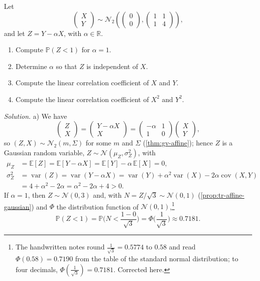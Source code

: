 \begin{example}\label{exa:gc-correlations}
Let
\[
  \begin{pmatrix}X\\Y\end{pmatrix}\sim\mathcal N_2\left(\begin{pmatrix}0\\0\end{pmatrix},
  \begin{pmatrix}1&1\\1&4\end{pmatrix}\right),
\]
and let $Z=Y-\alpha X$, with $\alpha\in\mathbb R$.
\begin{enumerate}[label=\alph*)]
  \item Compute $\mathbb P(Z<1)$ for $\alpha=1$.
  \item Determine $\alpha$ so that $Z$ is independent of $X$.
  \item Compute the linear correlation coefficient of $X$ and $Y$.
  \item Compute the linear correlation coefficient of $X^2$ and $Y^2$.
\end{enumerate}

\emph{Solution.} a) We have
\[
  \begin{pmatrix}Z\\X\end{pmatrix}=\begin{pmatrix}Y-\alpha X\\X\end{pmatrix}
  =\begin{pmatrix}-\alpha&1\\1&0\end{pmatrix}\begin{pmatrix}X\\Y\end{pmatrix},
\]
so $(Z,X)\sim\mathcal N_2(m,\Sigma)$ for some $m$ and $\Sigma$ (\cref{thm:gv-affine}); hence $Z$ is a
Gaussian random variable, $Z\sim\mathcal N(\mu_Z,\sigma_Z^2)$, with
\[
\begin{aligned}
  \mu_Z&=\mathbb E[Z]=\mathbb E[Y-\alpha X]=\mathbb E[Y]-\alpha\,\mathbb E[X]=0,\\
  \sigma_Z^2&=\operatorname{var}(Z)=\operatorname{var}(Y-\alpha X)
  =\operatorname{var}(Y)+\alpha^2\operatorname{var}(X)-2\alpha\operatorname{cov}(X,Y)\\
  &=4+\alpha^2-2\alpha=\alpha^2-2\alpha+4>0 .
\end{aligned}
\]
If $\alpha=1$, then $Z\sim\mathcal N(0,3)$ and, with $N=Z/\sqrt3\sim\mathcal N(0,1)$
(\cref{prop:tr-affine-gaussian}) and $\Phi$ the distribution function of
$\mathcal N(0,1)$,\footnote{The handwritten notes round $\frac1{\sqrt3}=0.5774$ to $0.58$ and read
$\Phi(0.58)=0.7190$ from the table of the standard normal distribution; to four decimals,
$\Phi(\frac1{\sqrt3})=0.7181$. Corrected here.}
\[
  \mathbb P(Z<1)=\mathbb P\Big(N<\frac{1-0}{\sqrt3}\Big)=\Phi\Big(\frac1{\sqrt3}\Big)\approx0.7181 .
\]


\end{example}
